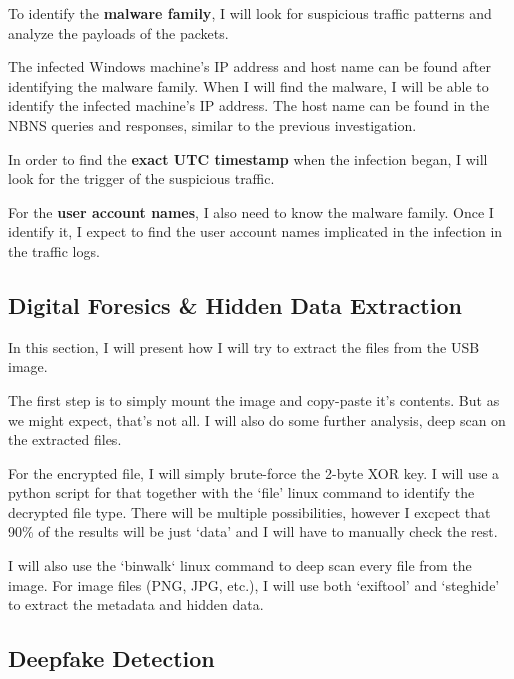 \documentclass[pdflatex,sn-mathphys-num]{sn-jnl}
\begin{document}
\par To identify the \textbf{malware family}, I will look for suspicious traffic patterns and analyze the payloads of
the packets.

\par The infected Windows machine's IP address and host name can be found after identifying the malware family. When I
will find the malware, I will be able to identify the infected machine's IP address. The host name can be found in the
NBNS queries and responses, similar to the previous investigation.

\par In order to find the \textbf{exact UTC timestamp} when the infection began, I will look for the trigger of the
suspicious traffic.

\par For the \textbf{user account names}, I also need to know the malware family. Once I identify it, I expect to find
the user account names implicated in the infection in the traffic logs.

\subsection{Digital Foresics \& Hidden Data Extraction}\label{dfhde}

\par In this section, I will present how I will try to extract the files from the USB image.

\par The first step is to simply mount the image and copy-paste it's contents. But as we might expect, that's not all.
I will also do some further analysis, deep scan on the extracted files.

\par For the encrypted file, I will simply brute-force the 2-byte XOR key. I will use a python script for that together
with the `file' linux command to identify the decrypted file type. There will be multiple possibilities, however I
excpect that 90\% of the results will be just `data' and I will have to manually check the rest.

\par I will also use the `binwalk` linux command to deep scan every file from the image. For image files (PNG, JPG, etc.),
I will use both `exiftool' and `steghide' to extract the metadata and hidden data.

\subsection{Deepfake Detection}
\end{document}
